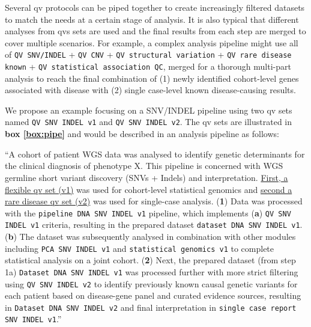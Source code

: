 Several \ac{qv} protocols can be piped together to create increasingly filtered datasets to match the needs at a certain stage of analysis. It is also typical that different analyses from \ac{qv}s sets are used and the final results from each step are merged to cover multiple scenarios. For example, a complex analysis pipeline might use all of
\colorbox{kispiblue!30}{\texttt{QV SNV/INDEL}} + 
\colorbox{kispiblue!30}{\texttt{QV CNV}} + 
\colorbox{kispiblue!30}{\texttt{QV structural variation}} + 
\colorbox{kispiblue!30}{\texttt{QV rare disease known}} + 
\colorbox{kispiblue!30}{\texttt{QV statistical association QC}}, merged for a thorough multi-part analysis to reach the final combination of (1) newly identified cohort-level genes associated with disease with (2) single case-level known disease-causing results.

We propose an example focusing on a SNV/INDEL pipeline using two \ac{qv} sets named 
\colorbox{colorSUNSET2!60}{\texttt{QV SNV INDEL v1}} and
\colorbox{colorSUNSET2!60}{\texttt{QV SNV INDEL v2}}.
The \ac{qv} sets are illustrated in 
\textbf{box \ref{box:pipe}}
and would be described in an analysis pipeline as follows:

``A cohort of patient WGS data was analysed to identify genetic determinants for the clinical diagnosis of phenotype X. 
This pipeline is concerned with WGS germline short variant discovery (SNVs + Indels) and interpretation.
\underline{First, a flexible \ac{qv} set (v1)} was used for cohort-level statistical genomics and \underline{second a rare disease \ac{qv} set (v2)} was used for single-case analysis.
(\textbf{1}) Data was processed with the 
\colorbox{colorSUNSET1!30}{\texttt{pipeline DNA SNV INDEL v1}} pipeline, which implements
(\textbf{a}) \colorbox{colorSUNSET2!60}{\texttt{QV SNV INDEL v1}} criteria, resulting in the prepared dataset
\colorbox{colorSUNSET3!30}{\texttt{dataset DNA SNV INDEL v1}}.
(\textbf{b}) The dataset was subsequently analysed in combination with other modules including 
\colorbox{colorSUNSET4!30}{\texttt{PCA SNV INDEL v1}} and 
\colorbox{colorSUNSET5!30}{\texttt{statistical genomics v1}} to complete statistical analysis on a joint cohort.
(\textbf{2}) Next, 
 the prepared dataset (from step 1a)
\colorbox{colorSUNSET3!30}{\texttt{Dataset DNA SNV INDEL v1}} was processed further with more strict filtering using
\colorbox{colorSUNSET2!60}{\texttt{QV SNV INDEL v2}} to identify previously known causal genetic variants for each patient based on disease-gene panel and curated evidence sources, resulting in \colorbox{colorSUNSET3!30}{\texttt{Dataset DNA SNV INDEL v2}} and final interpretation in
\colorbox{colorSUNSET5!30}{\texttt{single case report SNV INDEL v1}}.''

